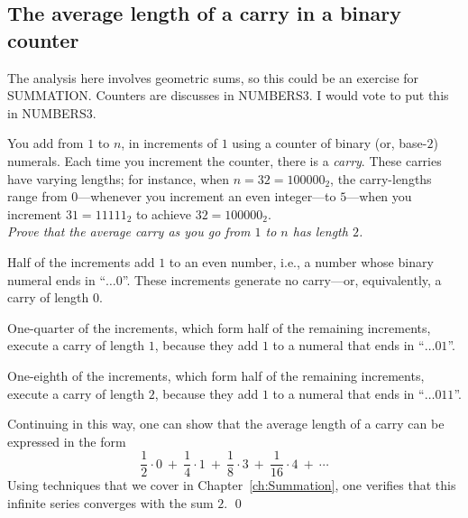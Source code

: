 \subsection{The average length of a carry in a binary counter}

{\Arny The analysis here involves geometric sums, so this could be an exercise for SUMMATION.  Counters are discusses in NUMBERS3.  I would vote to put this in NUMBERS3.}

\medskip

%
You add from $1$ to $n$, in increments of $1$ using a counter of
binary (or, base-$2$) numerals.  Each time you increment the counter,
there is a {\it carry}.  These carries have varying lengths; for
instance, when $n = 32 = 100000_2$, the carry-lengths range
from $0$---whenever you increment an even integer---to $5$---when you
increment $31 = 11111_2$ to achieve $32 = 100000_2$. \\
{\em Prove that the average carry as you go from $1$ to $n$ has length $2$.}
\medskip


\noindent
Half of the increments add $1$ to an even number, i.e., a number whose
binary numeral ends in ``$ \ldots 0$''.  These increments generate no
carry---or, equivalently, a carry of length $0$.

\noindent
One-quarter of the increments, which form half of the remaining
increments, execute a carry of length $1$, because they add $1$ to a
numeral that ends in ``$ \ldots 01$''.

\noindent
One-eighth of the increments, which form half of the remaining
increments, execute a carry of length $2$, because they add $1$ to a
numeral that ends in ``$ \ldots 011$''.

Continuing in this way, one can show that the average length of a
carry can be expressed in the form
\[ 
\frac{1}{2} \cdot 0 \ + \ \frac{1}{4} \cdot 1 \ + \ \frac{1}{8} \cdot
3 \ + \ \frac{1}{16} \cdot 4 \ + \ \cdots
\]
Using techniques that we cover in Chapter~\ref{ch:Summation}, one
verifies that this infinite series converges with the sum $2$.  \qed


